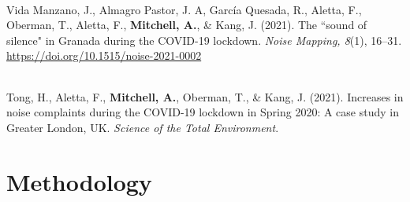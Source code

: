 \documentclass[oneside,fontsize=11pt,titlepage,chapterprefix=true
]{scrbook}
\begin{document}
\paragraph*{}
Vida Manzano, J., Almagro Pastor, J. A, Garc\'ia Quesada, R., Aletta, F., Oberman, T., Aletta, F., \textbf{Mitchell, A.}, \& Kang, J. (2021). The ``sound of silence" in Granada during the COVID-19 lockdown. \emph{Noise Mapping, 8}(1), 16--31. \url{https://doi.org/10.1515/noise-2021-0002}

\paragraph*{}Tong, H., Aletta, F., \textbf{Mitchell, A.}, Oberman, T., \& Kang, J. (2021). Increases in noise complaints during the COVID-19 lockdown in Spring 2020: A case study in Greater London, UK. \emph{Science of the Total Environment}.










\tableofcontents

\newpage
\listoffigures

\newpage
\listoftables


\mainmatter





\part{Methodology}
\label{part:Methodology}
\end{document}
